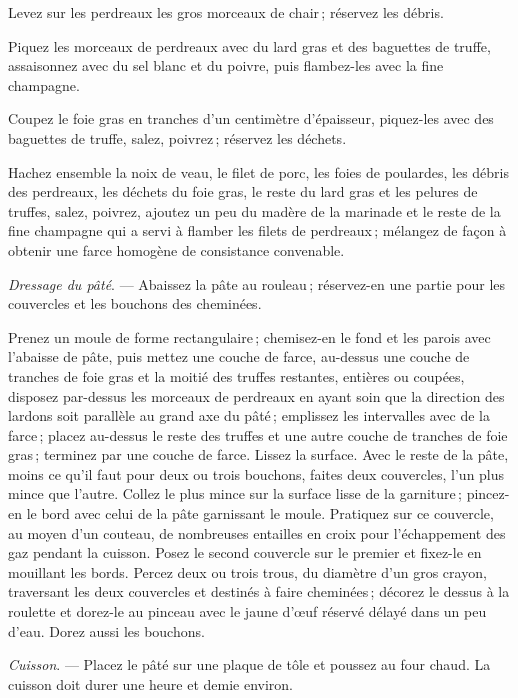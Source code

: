 Levez sur les perdreaux les gros morceaux de chair ; réservez les débris.

Piquez les morceaux de perdreaux avec du lard gras et des baguettes de truffe,
assaisonnez avec du sel blanc et du poivre, puis flambez-les avec la fine
champagne.

Coupez le foie gras en tranches d'un centimètre d'épaisseur, piquez-les avec
des baguettes de truffe, salez, poivrez ; réservez les déchets.

Hachez ensemble la noix de veau, le filet de porc, les foies de poulardes, les
débris des perdreaux, les déchets du foie gras, le reste du lard gras et les
pelures de truffes, salez, poivrez, ajoutez un peu du madère de la marinade et
le reste de la fine champagne qui a servi à flamber les filets de perdreaux ;
mélangez de façon à obtenir une farce homogène de consistance convenable.

\medskip

\textit{Dressage du pâté}. — Abaissez la pâte au rouleau ; réservez-en une
partie pour les couvercles et les bouchons des cheminées.

Prenez un moule de forme rectangulaire ; chemisez-en le fond et les parois avec
l'abaisse de pâte, puis mettez une couche de farce, au-dessus une couche de
tranches de foie gras et la moitié des truffes restantes, entières ou coupées,
disposez par-dessus les morceaux de perdreaux en ayant soin que la direction
des lardons soit parallèle au grand axe du pâté ; emplissez les intervalles
avec de la farce ; placez au-dessus le reste des truffes et une autre couche de
tranches de foie gras ; terminez par une couche de farce. Lissez la surface.
Avec le reste de la pâte, moins ce qu'il faut pour deux ou trois bouchons,
faites deux couvercles, l'un plus mince que l’autre. Collez le plus mince sur
la surface lisse de la garniture ; pincez-en le bord avec celui de la pâte
garnissant le moule. Pratiquez sur ce couvercle, au moyen d'un couteau, de
nombreuses entailles en croix pour l'échappement des gaz pendant la cuisson.
Posez le second couvercle sur le premier et fixez-le en mouillant les bords.
Percez deux ou trois trous, du diamètre d'un gros crayon, traversant les deux
couvercles et destinés à faire cheminées ; décorez le dessus à la roulette et
dorez-le au pinceau avec le jaune d'œuf réservé délayé dans un peu d'eau. Dorez
aussi les bouchons.

\medskip

\textit{Cuisson}. — Placez le pâté sur une plaque de tôle et poussez au four
chaud. La cuisson doit durer une heure et demie environ.

